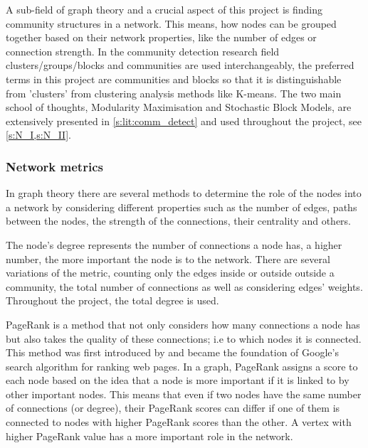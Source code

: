 A sub-field of graph theory and a crucial aspect of this project is finding community structures in a network. This means, how nodes can be grouped together based on their network properties, like the number of edges or connection strength. In the community detection research field clusters/groups/blocks and communities are used interchangeably, the preferred terms in this project are communities and blocks so that it is distinguishable from 'clusters' from clustering analysis methods like K-means. The two main school of thoughts, Modularity Maximisation and Stochastic Block Models, are extensively presented in \cref{s:lit:comm_detect} and used throughout the project, see \cref{s:N_I,s:N_II}.




\subsubsection*{Network metrics} \label{s:lit:net_metrics}

In graph theory there are several methods to determine the role of the nodes into a network by considering different properties such as the number of edges, paths between the nodes, the strength of the connections, their centrality and others.

The node's degree represents the number of connections a node has, a higher number, the more important the node is to the network. There are several variations of the metric, counting only the edges inside or outside outside a community, the total number of connections as well as considering edges' weights. Throughout the project, the total degree is used.

PageRank is a method that not only considers how many connections a node has but also takes the quality of these connections; i.e to which nodes it is connected. This method was first introduced by \citep{Brin1998-mc} and became the foundation of Google's search algorithm for ranking web pages. In a graph, PageRank assigns a score to each node based on the idea that a node is more important if it is linked to by other important nodes. This means that even if two nodes have the same number of connections (or degree), their PageRank scores can differ if one of them is connected to nodes with higher PageRank scores than the other. A vertex with higher PageRank value has a more important role in the network.

